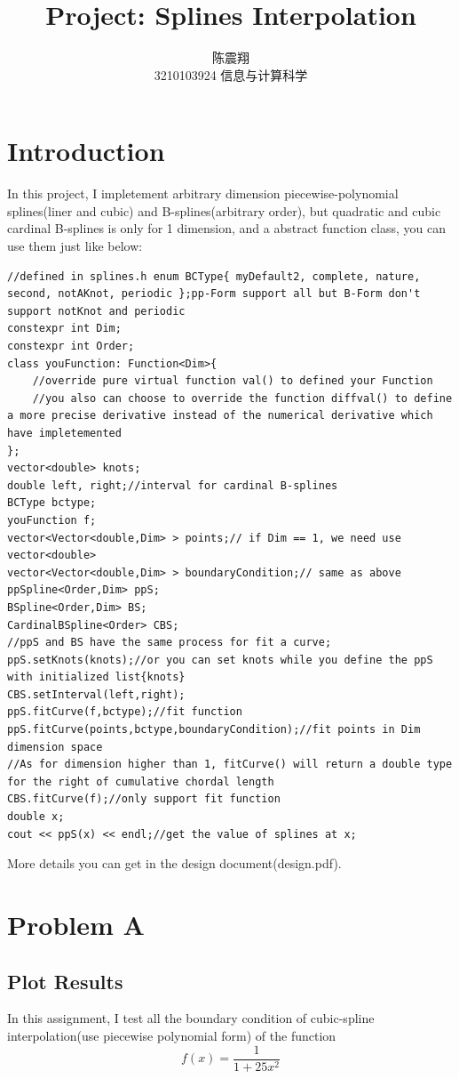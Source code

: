 \documentclass{article}
\title{{\bf Project: Splines Interpolation}}
\author{陈震翔\\3210103924 信息与计算科学}
\date{}
\begin{document}
\maketitle

\section{Introduction}
In this project, I impletement arbitrary dimension piecewise-polynomial splines(liner and cubic) and B-splines(arbitrary order), but quadratic and cubic cardinal B-splines is only for 1 dimension, and a abstract function class, you can use them just like below:
\begin{lstlisting}
//defined in splines.h enum BCType{ myDefault2, complete, nature, second, notAKnot, periodic };pp-Form support all but B-Form don't support notKnot and periodic
constexpr int Dim;
constexpr int Order;
class youFunction: Function<Dim>{
    //override pure virtual function val() to defined your Function 
    //you also can choose to override the function diffval() to define a more precise derivative instead of the numerical derivative which have impletemented
};
vector<double> knots;
double left, right;//interval for cardinal B-splines
BCType bctype;
youFunction f;
vector<Vector<double,Dim> > points;// if Dim == 1, we need use vector<double>
vector<Vector<double,Dim> > boundaryCondition;// same as above
ppSpline<Order,Dim> ppS;
BSpline<Order,Dim> BS;
CardinalBSpline<Order> CBS;
//ppS and BS have the same process for fit a curve;
ppS.setKnots(knots);//or you can set knots while you define the ppS with initialized list{knots}
CBS.setInterval(left,right);
ppS.fitCurve(f,bctype);//fit function
ppS.fitCurve(points,bctype,boundaryCondition);//fit points in Dim dimension space
//As for dimension higher than 1, fitCurve() will return a double type for the right of cumulative chordal length
CBS.fitCurve(f);//only support fit function
double x;
cout << ppS(x) << endl;//get the value of splines at x; 
\end{lstlisting}

More details you can get in the design document(design.pdf).

\newpage

\section{Problem A}
\subsection{Plot Results}
In this assignment, I test all the boundary condition of cubic-spline interpolation(use piecewise polynomial form) of the function
$$f(x)=\frac{1}{1+25x^2}$$
\end{document}
